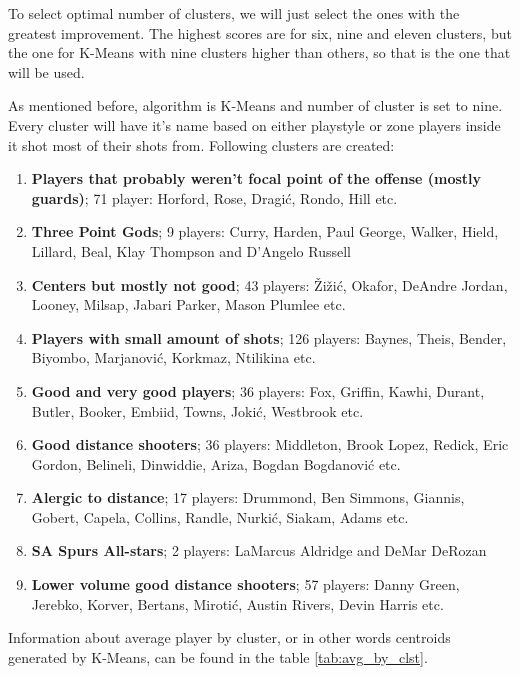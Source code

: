 \documentclass[a4paper]{article}
\begin{document}
To select optimal number of clusters, we will just select the ones with the greatest improvement. The highest scores are for six, nine and eleven clusters, but the one for K-Means with nine clusters higher than others, so that is the one that will be used.

As mentioned before, algorithm is K-Means and number of cluster is set to nine. Every cluster will have it's name based on either playstyle or zone players inside it shot most of their shots from. Following clusters are created:

\begin{enumerate}
	\item \textbf{Players that probably weren't focal point of the offense (mostly guards)}; 71 player: Horford, Rose, Dragić, Rondo, Hill etc.
	\item \textbf{Three Point Gods}; 9 players: Curry, Harden, Paul George, Walker, Hield, Lillard, Beal, Klay Thompson and D'Angelo Russell
	\item \textbf{Centers but mostly not good}; 43 players: Žižić, Okafor, DeAndre Jordan, Looney, Milsap, Jabari Parker, Mason Plumlee etc.
	\item \textbf{Players with small amount of shots}; 126 players: Baynes, Theis, Bender, Biyombo, Marjanović, Korkmaz, Ntilikina etc.
	\item \textbf{Good and very good players}; 36 players: Fox, Griffin, Kawhi, Durant, Butler, Booker, Embiid, Towns, Jokić, Westbrook etc.
	\item \textbf{Good distance shooters}; 36 players: Middleton, Brook Lopez, Redick, Eric Gordon, Belineli, Dinwiddie, Ariza, Bogdan Bogdanović etc.
	\item \textbf{Alergic to distance}; 17 players: Drummond, Ben Simmons, Giannis, Gobert, Capela, Collins, Randle, Nurkić, Siakam, Adams etc.
	\item \textbf{SA Spurs All-stars}; 2 players: LaMarcus Aldridge and DeMar DeRozan
	\item \textbf{Lower volume good distance shooters}; 57 players: Danny Green, Jerebko, Korver, Bertans, Mirotić, Austin Rivers, Devin Harris etc.
\end{enumerate}

Information about average player by cluster, or in other words centroids generated by K-Means, can be found in the table \ref{tab:avg_by_clst}.
\end{document}
